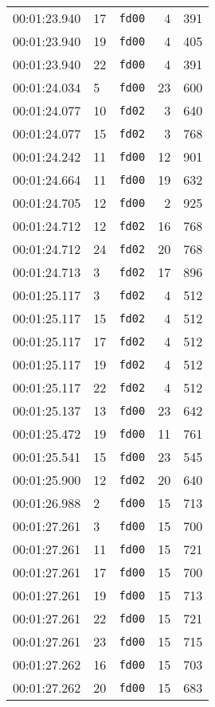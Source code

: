 \documentclass{article}
\begin{document}
\begin{longtable}{lllrr}
00:01:23.940 & 17 & \texttt{fd00} & 4 & 391 \\
00:01:23.940 & 19 & \texttt{fd00} & 4 & 405 \\
00:01:23.940 & 22 & \texttt{fd00} & 4 & 391 \\
00:01:24.034 & 5 & \texttt{fd00} & 23 & 600 \\
00:01:24.077 & 10 & \texttt{fd02} & 3 & 640 \\
00:01:24.077 & 15 & \texttt{fd02} & 3 & 768 \\
00:01:24.242 & 11 & \texttt{fd00} & 12 & 901 \\
00:01:24.664 & 11 & \texttt{fd00} & 19 & 632 \\
00:01:24.705 & 12 & \texttt{fd00} & 2 & 925 \\
00:01:24.712 & 12 & \texttt{fd02} & 16 & 768 \\
00:01:24.712 & 24 & \texttt{fd02} & 20 & 768 \\
00:01:24.713 & 3 & \texttt{fd02} & 17 & 896 \\
00:01:25.117 & 3 & \texttt{fd02} & 4 & 512 \\
00:01:25.117 & 15 & \texttt{fd02} & 4 & 512 \\
00:01:25.117 & 17 & \texttt{fd02} & 4 & 512 \\
00:01:25.117 & 19 & \texttt{fd02} & 4 & 512 \\
00:01:25.117 & 22 & \texttt{fd02} & 4 & 512 \\
00:01:25.137 & 13 & \texttt{fd00} & 23 & 642 \\
00:01:25.472 & 19 & \texttt{fd00} & 11 & 761 \\
00:01:25.541 & 15 & \texttt{fd00} & 23 & 545 \\
00:01:25.900 & 12 & \texttt{fd02} & 20 & 640 \\
00:01:26.988 & 2 & \texttt{fd00} & 15 & 713 \\
00:01:27.261 & 3 & \texttt{fd00} & 15 & 700 \\
00:01:27.261 & 11 & \texttt{fd00} & 15 & 721 \\
00:01:27.261 & 17 & \texttt{fd00} & 15 & 700 \\
00:01:27.261 & 19 & \texttt{fd00} & 15 & 713 \\
00:01:27.261 & 22 & \texttt{fd00} & 15 & 721 \\
00:01:27.261 & 23 & \texttt{fd00} & 15 & 715 \\
00:01:27.262 & 16 & \texttt{fd00} & 15 & 703 \\
00:01:27.262 & 20 & \texttt{fd00} & 15 & 683 \\

\end{longtable}
\end{document}
